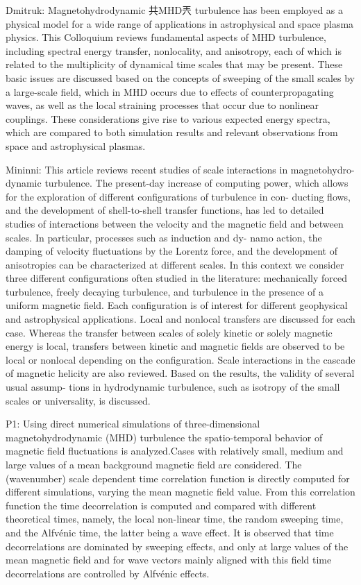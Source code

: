 Dmitruk:
Magnetohydrodynamic 共MHD兲 turbulence has been employed as a physical model for a wide range of
applications in astrophysical and space plasma physics. This Colloquium reviews fundamental aspects
of MHD turbulence, including spectral energy transfer, nonlocality, and anisotropy, each of which is
related to the multiplicity of dynamical time scales that may be present. These basic issues are
discussed based on the concepts of sweeping of the small scales by a large-scale field, which in MHD
occurs due to effects of counterpropagating waves, as well as the local straining processes that occur
due to nonlinear couplings. These considerations give rise to various expected energy spectra, which
are compared to both simulation results and relevant observations from space and astrophysical
plasmas.

Mininni:
This article reviews recent studies of scale interactions in magnetohydro-
dynamic turbulence. The present-day increase of computing power, which
allows for the exploration of different configurations of turbulence in con-
ducting flows, and the development of shell-to-shell transfer functions, has
led to detailed studies of interactions between the velocity and the magnetic
field and between scales. In particular, processes such as induction and dy-
namo action, the damping of velocity fluctuations by the Lorentz force, and
the development of anisotropies can be characterized at different scales. In
this context we consider three different configurations often studied in the
literature: mechanically forced turbulence, freely decaying turbulence, and
turbulence in the presence of a uniform magnetic field. Each configuration is
of interest for different geophysical and astrophysical applications. Local and
nonlocal transfers are discussed for each case. Whereas the transfer between
scales of solely kinetic or solely magnetic energy is local, transfers between
kinetic and magnetic fields are observed to be local or nonlocal depending
on the configuration. Scale interactions in the cascade of magnetic helicity
are also reviewed. Based on the results, the validity of several usual assump-
tions in hydrodynamic turbulence, such as isotropy of the small scales or
universality, is discussed.


P1:
Using direct numerical simulations of three-dimensional magnetohydrodynamic (MHD)
turbulence the spatio-temporal behavior of magnetic field
fluctuations is analyzed.Cases with relatively small, medium and
large values of a mean background magnetic field are considered. The
(wavenumber) scale dependent time correlation function is directly
computed for different simulations, varying the mean magnetic field
value. From this correlation function the time decorrelation is
computed and compared with different theoretical times, namely,
the local non-linear time, the random sweeping time, and the
Alfv\'enic time, the latter being a wave effect. It is observed that
time decorrelations are dominated by sweeping effects, and only at
large values of the mean magnetic field and for wave vectors mainly
aligned with this field time decorrelations are controlled by
Alfv\'enic effects.


